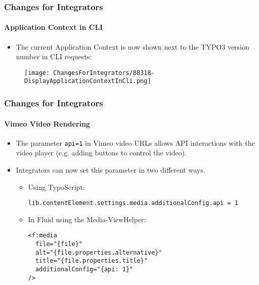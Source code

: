 
\begin{frame}[fragile]
	\frametitle{Changes for Integrators}
	\framesubtitle{Application Context in CLI}

	\begin{itemize}
		\item The current Application Context is now shown next to the
			TYPO3 version number in CLI requests:
	\end{itemize}

	\begin{figure}
		\texttt{[image: ChangesForIntegrators/88318-DisplayApplicationContextInCli.png]}
	\end{figure}

\end{frame}


\begin{frame}[fragile]
	\frametitle{Changes for Integrators}
	\framesubtitle{Vimeo Video Rendering}

	\lstset{basicstyle=\smaller\ttfamily}

	\begin{itemize}
		\item The parameter \texttt{api=1} in Vimeo video URLs allows API interactions with the video player (e.g. adding buttons to control the video).
		\item Integrators can now set this parameter in two different ways.

		\begin{itemize}
			\item Using TypoScript:

\begin{lstlisting}
lib.contentElement.settings.media.additionalConfig.api = 1
\end{lstlisting}

			\item In Fluid using the Media-ViewHelper:

\begin{lstlisting}
<f:media
  file="{file}"
  alt="{file.properties.alternative}"
  title="{file.properties.title}"
  additionalConfig="{api: 1}"
/>
\end{lstlisting}

		\end{itemize}
	\end{itemize}

\end{frame}


